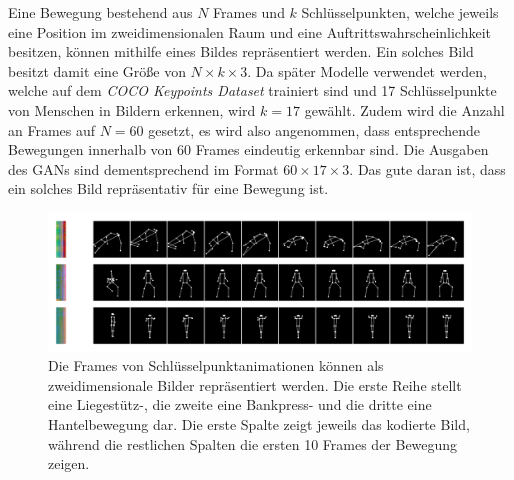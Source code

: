Eine Bewegung bestehend aus $N$ Frames und $k$ Schlüsselpunkten, welche jeweils
eine Position im zweidimensionalen Raum und eine Auftrittswahrscheinlichkeit
besitzen, können mithilfe eines Bildes repräsentiert werden. Ein solches Bild
besitzt damit eine Größe von $N \times k \times 3$. Da später Modelle verwendet
werden, welche auf dem \textit{COCO Keypoints Dataset} trainiert sind und 17
Schlüsselpunkte von Menschen in Bildern erkennen, wird $k = 17$ gewählt. Zudem
wird die Anzahl an Frames auf $N = 60$ gesetzt, es wird also angenommen, dass
entsprechende Bewegungen innerhalb von 60 Frames eindeutig erkennbar sind. Die
Ausgaben des GANs sind dementsprechend im Format $60 \times 17 \times 3$. Das gute daran ist, dass ein solches Bild repräsentativ für eine Bewegung ist.

\begin{figure}
    \includegraphics[width=\textwidth]{images/motion_image.png}
    \caption{Die Frames von Schlüsselpunktanimationen können als zweidimensionale Bilder repräsentiert werden. Die erste Reihe stellt eine Liegestütz-, die zweite eine Bankpress- und die dritte eine Hantelbewegung dar. Die erste Spalte zeigt jeweils das kodierte Bild, während die restlichen Spalten die ersten 10 Frames der Bewegung zeigen.}
    \label{fig:motion-images}
\end{figure}
